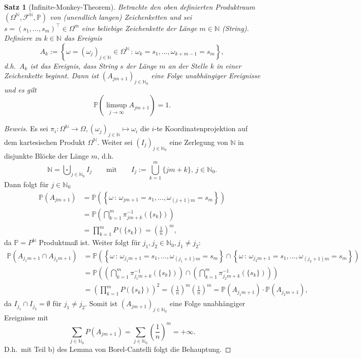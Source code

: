 \documentclass[10pt,]{article}
\newtheorem{satz}{Satz}
\begin{document}
\begin{satz}[Infinite-Monkey-Theorem]
Betrachte den oben definierten Produktraum $(\Omega^{\mathbb{N}}, \mathcal{F}^{\mathbb{N}}, \mathbb{P})$ von (unendlich langen) Zeichenketten und sei $s = (s_1, \ldots, s_m)^\top \in \Omega^m$ eine beliebige Zeichenkette der Länge $m \in \mathbb{N}$ (String). Definiere zu $k \in \mathbb{N}$ das Ereignis
$$ 
A_{k} := \left\{ \omega = (\omega_j)_{j \in \mathbb{N}} \in \Omega^{\mathbb{N}} \, : \, \omega_k = s_1, \ldots, \omega_{k+m-1} = s_m \right\},
$$
d.h.\ $A_k$ ist das Ereignis, dass String $s$ der Länge $m$ an der Stelle $k$ in einer Zeichenkette beginnt. Dann ist $(A_{jm+1})_{j \in \mathbb{N}_0}$ eine Folge unabhängiger Ereignisse und es gilt
$$
\mathbb{P} \left( \limsup_{j \to \infty} A_{jm+1} \right) = 1.
$$
\end{satz}

\begin{proof}[Beweis]
Es sei $\pi_i: \Omega^{\mathbb{N}} \to \Omega, (\omega_j)_{j \in \mathbb{N}} \mapsto \omega_i$ die $i$-te Koordinatenprojektion auf dem kartesischen Produkt $\Omega^{\mathbb{N}}$. Weiter sei $(I_j)_{j \in \mathbb{N}_0}$ eine Zerlegung von $\mathbb{N}$ in disjunkte Blöcke der Länge $m$, d.h.\ 
$$
\mathbb{N} = \bigcupdot_{j \in \mathbb{N}_0} I_j \qquad \text{mit} \qquad I_j := \bigcup_{k = 1}^m \{jm+k\}, \, j \in \mathbb{N}_0.
$$
Dann folgt für $j \in \mathbb{N}_0$
$$
\begin{aligned}
\mathbb{P}(A_{jm+1}) &= \mathbb{P}\left( \left\{ \omega \, : \, \omega_{jm+1} = s_1, \ldots, \omega_{(j+1)m} = s_m \right\} \right) \\
&= \mathbb{P}\left( \bigcap_{k = 1}^m \pi_{jm+k}^{-1}(\{s_k\}) \right) \\
&= \prod_{k=1}^m P(\{s_k\}) = \left(\frac{1}{n} \right)^m,
\end{aligned}
$$
da $\mathbb{P} = P^{\mathbb{N}}$ Produktmaß ist. Weiter folgt für $j_1, j_2 \in \mathbb{N}_0, j_1 \not = j_2$:
$$
\begin{aligned}
\mathbb{P} \left( A_{j_1m+1} \cap A_{j_2m+1} \right) &= \mathbb{P}\left( \left\{ \omega \, : \, \omega_{j_1m+1} = s_1, \ldots, \omega_{(j_1+1)m} = s_m \right\} \cap \left\{ \omega \, : \, \omega_{j_2m+1} = s_1, \ldots, \omega_{(j_2+1)m} = s_m \right\} \right) \\
&= \mathbb{P}\left( \left( \bigcap_{k = 1}^m \pi_{j_1m+k}^{-1}(\{s_k\}) \right) \cap \left( \bigcap_{k = 1}^m \pi_{j_2m+k}^{-1}(\{s_k\}) \right) \right) \\
&= \left( \prod_{k=1}^m P(\{s_k\}) \right)^2 = \left(\frac{1}{n} \right)^m  \left(\frac{1}{n} \right)^m = \mathbb{P}(A_{j_1m+1}) \cdot \mathbb{P}(A_{j_2m+1}),
\end{aligned}
$$
da $I_{j_1} \cap I_{j_2} = \emptyset$ für $j_1 \not= j_2$. Somit ist $(A_{jm+1})_{j \in \mathbb{N}_0}$ eine Folge unabhängiger Ereignisse mit
$$
\sum_{j \in \mathbb{N}_0} P(A_{jm+1}) = \sum_{j \in \mathbb{N}_0} \left(\frac{1}{n}\right)^m = + \infty.
$$
D.h.\ mit Teil b) des Lemma von Borel-Cantelli folgt die Behauptung.
\end{proof}
\end{document}
